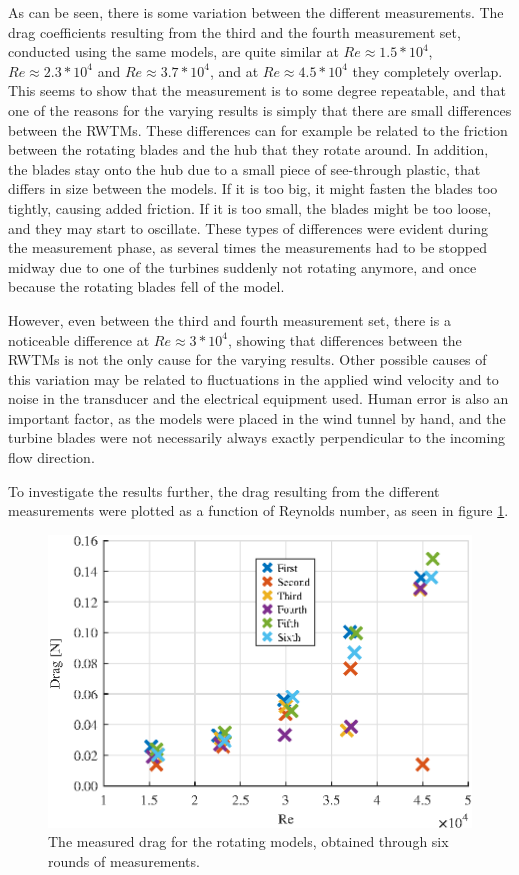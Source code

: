 As can be seen, there is some variation between the different measurements. The drag coefficients resulting from the third and the fourth measurement set, conducted using the same models, are quite similar at $Re \approx 1.5*10^4$, $Re \approx 2.3*10^4$ and $Re \approx 3.7*10^4$, and at $Re \approx 4.5*10^4$ they completely overlap. This seems to show that the measurement is to some degree repeatable, and that one of the reasons for the varying results is simply that there are small differences between the \gls{RWTM}s. These differences can for example be related to the friction between the rotating blades and the hub that they rotate around. In addition, the blades stay onto the hub due to a small piece of see-through plastic, that differs in size between the models. If it is too big, it might fasten the blades too tightly, causing added friction. If it is too small, the blades might be too loose, and they may start to oscillate. These types of differences were evident during the measurement phase, as several times the measurements had to be stopped midway due to one of the turbines suddenly not rotating anymore, and once because the rotating blades fell of the model.  

However, even between the third and fourth measurement set, there is a noticeable difference at $Re \approx 3*10^4$, showing that differences between the \gls{RWTM}s is not the only cause for the varying results. Other possible causes of this variation may be related to fluctuations in the applied wind velocity and to noise in the transducer and the electrical equipment used. Human error is also an important factor, as the models were placed in the wind tunnel by hand, and the turbine blades were not necessarily always exactly perpendicular to the incoming flow direction.   

To investigate the results further, the drag resulting from the different measurements were plotted as a function of Reynolds number, as seen in figure \ref{fig:RotationalDrag}.


\begin{figure}
    \centering
    \includegraphics[width=0.8\linewidth]{0_Images/RotationalDragRe.eps}
    \caption{The measured drag for the rotating models, obtained through six rounds of measurements.}
    \label{fig:RotationalDrag}
\end{figure}

